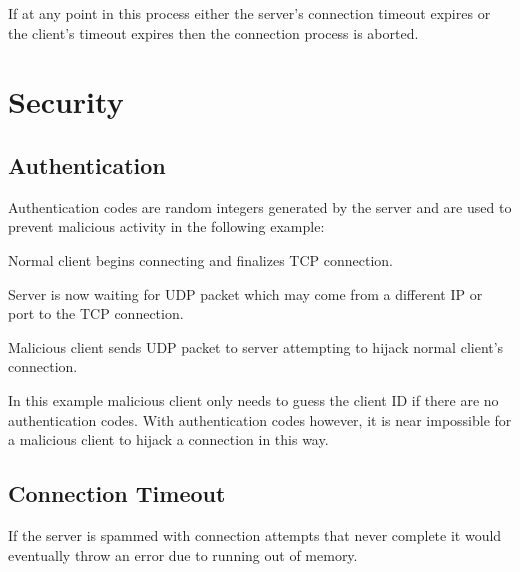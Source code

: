 \begin{DoxyItemize}
\item If at any point in this process either the server's connection timeout expires or the client's timeout expires then the connection process is aborted.\par
\par

\end{DoxyItemize}\hypertarget{handshake_page_handshakeSecurity}{}\section{Security}\label{handshake_page_handshakeSecurity}
\hypertarget{handshake_page_handshakeSecurityAuthentication}{}\subsection{Authentication}\label{handshake_page_handshakeSecurityAuthentication}
Authentication codes are random integers generated by the server and are used to prevent malicious activity in the following example:
\begin{DoxyItemize}
\item Normal client begins connecting and finalizes TCP connection.
\item Server is now waiting for UDP packet which may come from a different IP or port to the TCP connection.
\item Malicious client sends UDP packet to server attempting to hijack normal client's connection.\par

\end{DoxyItemize}

In this example malicious client only needs to guess the client ID if there are no authentication codes. With authentication codes however, it is near impossible for a malicious client to hijack a connection in this way.\par
\par
\hypertarget{handshake_page_handshakeSecurityConnectionTimeout}{}\subsection{Connection Timeout}\label{handshake_page_handshakeSecurityConnectionTimeout}
If the server is spammed with connection attempts that never complete it would eventually throw an error due to running out of memory.

